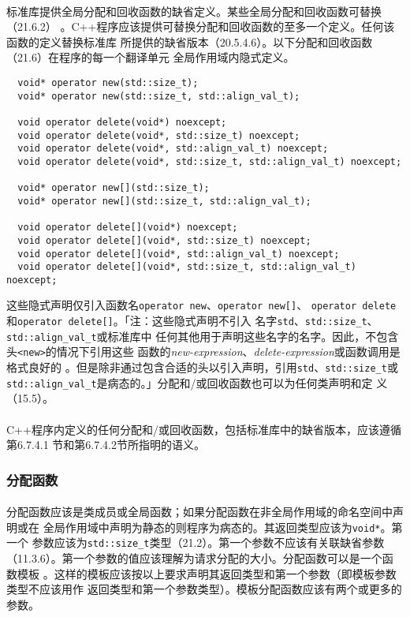 \paragraph{}
标准库提供全局分配和回收函数的缺省定义。某些全局分配和回收函数可替换（21.6.2）
。C++程序应该提供可替换分配和回收函数的至多一个定义。任何该函数的定义替换标准库
所提供的缺省版本（20.5.4.6）。以下分配和回收函数（21.6）在程序的每一个翻译单元
全局作用域内隐式定义。
\begin{lstlisting}
  void* operator new(std::size_t);
  void* operator new(std::size_t, std::align_val_t);

  void operator delete(void*) noexcept;
  void operator delete(void*, std::size_t) noexcept;
  void operator delete(void*, std::align_val_t) noexcept;
  void operator delete(void*, std::size_t, std::align_val_t) noexcept;

  void* operator new[](std::size_t);
  void* operator new[](std::size_t, std::align_val_t);

  void operator delete[](void*) noexcept;
  void operator delete[](void*, std::size_t) noexcept;
  void operator delete[](void*, std::align_val_t) noexcept;
  void operator delete[](void*, std::size_t, std::align_val_t) noexcept;
\end{lstlisting}
这些隐式声明仅引入函数名\texttt{operator new}、\texttt{operator new[]}、
\texttt{operator delete}和\texttt{operator delete[]}。「注：这些隐式声明不引入
名字\texttt{std}、\texttt{std::size\_t}、\texttt{std::align\_val\_t}或标准库中
任何其他用于声明这些名字的名字。因此，不包含头\texttt{<new>}的情况下引用这些
函数的\textit{new-expression}、\textit{delete-expression}或函数调用是格式良好的
。但是除非通过包含合适的头以引入声明，引用\texttt{std}、\texttt{std::size\_t}或
\texttt{std::align\_val\_t}是病态的。」分配和/或回收函数也可以为任何类声明和定
义（15.5）。

\paragraph{}
C++程序内定义的任何分配和/或回收函数，包括标准库中的缺省版本，应该遵循第6.7.4.1
节和第6.7.4.2节所指明的语义。

\subsubsection{分配函数}
\paragraph{}
分配函数应该是类成员或全局函数；如果分配函数在非全局作用域的命名空间中声明或在
全局作用域中声明为静态的则程序为病态的。其返回类型应该为\texttt{void*}。第一个
参数应该为\texttt{std::size\_t}类型（21.2）。第一个参数不应该有关联缺省参数
（11.3.6）。第一个参数的值应该理解为请求分配的大小。分配函数可以是一个函数模板
。这样的模板应该按以上要求声明其返回类型和第一个参数（即模板参数类型不应该用作
返回类型和第一个参数类型）。模板分配函数应该有两个或更多的参数。

